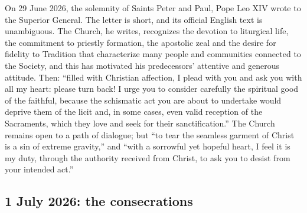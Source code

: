 On 29 June 2026, the solemnity of Saints Peter and Paul, Pope Leo XIV
wrote to the Superior General. The letter is short, and its official
English text is unambiguous. The Church, he writes, recognizes the
devotion to liturgical life, the commitment to priestly formation, the
apostolic zeal and the desire for fidelity to Tradition that characterize
many people and communities connected to the Society, and this has
motivated his predecessors' attentive and generous attitude. Then:
``filled with Christian affection, I plead with you and ask you with all
my heart: please turn back! I urge you to consider carefully the
spiritual good of the faithful, because the schismatic act you are about
to undertake would deprive them of the licit and, in some cases, even
valid reception of the Sacraments, which they love and seek for their
sanctification.'' The Church remains open to a path of dialogue; but ``to
tear the seamless garment of Christ is a sin of extreme gravity,'' and
``with a sorrowful yet hopeful heart, I feel it is my duty, through the
authority received from Christ, to ask you to desist from your intended
act.''


\subsection{1 July 2026: the consecrations}

